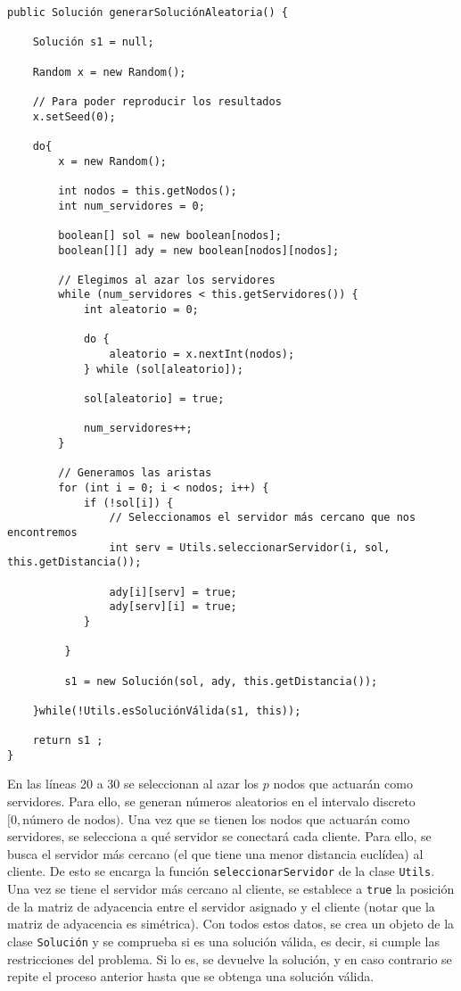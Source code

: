 \documentclass[11pt,a4paper,twoside,openright,titlepage,final]{article}
\begin{document}
\begin{verbatim}
public Solución generarSoluciónAleatoria() {

    Solución s1 = null;

    Random x = new Random();

    // Para poder reproducir los resultados
    x.setSeed(0);

    do{
        x = new Random();

        int nodos = this.getNodos();
        int num_servidores = 0;

        boolean[] sol = new boolean[nodos];
        boolean[][] ady = new boolean[nodos][nodos];

        // Elegimos al azar los servidores
        while (num_servidores < this.getServidores()) {
            int aleatorio = 0;
        
            do {
                aleatorio = x.nextInt(nodos);
            } while (sol[aleatorio]);

            sol[aleatorio] = true;

            num_servidores++;
        }

        // Generamos las aristas
        for (int i = 0; i < nodos; i++) {
            if (!sol[i]) {
                // Seleccionamos el servidor más cercano que nos encontremos
                int serv = Utils.seleccionarServidor(i, sol, this.getDistancia());

                ady[i][serv] = true;
                ady[serv][i] = true;
            }

         }

         s1 = new Solución(sol, ady, this.getDistancia());

    }while(!Utils.esSoluciónVálida(s1, this));

    return s1 ;
}
\end{verbatim}

En las líneas 20 a 30 se seleccionan al azar los $p$ nodos que actuarán como servidores. Para ello, se generan números aleatorios en el intervalo discreto $[0, \text{número de nodos})$. Una vez que se tienen los nodos que actuarán como servidores, se selecciona a qué servidor se conectará cada cliente. Para ello, se busca el servidor más cercano (el que tiene una menor distancia euclídea) al cliente. De esto se encarga la función \texttt{seleccionarServidor} de la clase \texttt{Utils}. Una vez se tiene el servidor más cercano al cliente, se establece a \texttt{true} la posición de la matriz de adyacencia entre el servidor asignado y el cliente (notar que la matriz de adyacencia es simétrica). Con todos estos datos, se crea un objeto de la clase \texttt{Solución} y se comprueba si es una solución válida, es decir, si cumple las restricciones del problema. Si lo es, se devuelve la solución, y en caso contrario se repite el proceso anterior hasta que se obtenga una solución válida.\\
\end{document}
